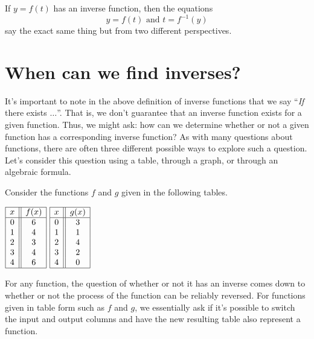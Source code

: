 \documentclass[nooutcomes]{ximera}
\begin{document}
If $y = f(t)$ has an inverse function, then the equations
$$
y = f(t) \text{ and } t = f^{-1}(y)
$$
say the exact same thing but from two different perspectives. 


\section{When can we find inverses?}
 It's important to note in the above definition of inverse functions that we say ``\emph{If} there exists $\ldots$''.  That is, we don't guarantee that an inverse function exists for a given function.  Thus, we might ask: how can we determine whether or not a given function has a corresponding inverse function?  As with many questions about functions, there are often three different possible ways to explore such a question. Let's consider this question using a table, through a graph, or through an algebraic formula.

Consider the functions $f$ and $g$ given in the following tables. 

\begin{center}
$
\begin{array}{ |c || c|  }
 \hline
 x & f(x)\\
 \hline
 0&6\\
 1&4\\
 2&3\\
 3&4\\
 4&6\\
 \hline
\end{array} 
$
\hspace{2cm}
$
\begin{array}{ |c || c|  }
 \hline
 x & g(x)\\
 \hline
 0&3\\
 1&1\\
 2&4\\
 3&2\\
 4&0\\
 \hline
\end{array} 
$
\end{center}

For any function, the question of whether or not it has an inverse comes down to whether or not the process of the function can be reliably reversed.  For functions given in table form such as $f$ and $g$, we essentially ask if it's possible to switch the input and output columns and have the new resulting table also represent a function.
\end{document}
